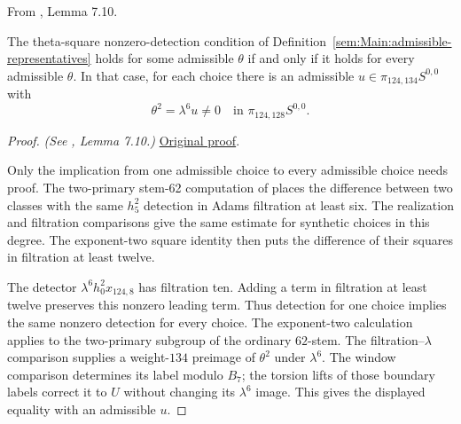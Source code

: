 \begin{lemma}
\label{paper:7.10}
From \cite{LWX126}, Lemma 7.10.\par

\label{lem:equistate4}
The theta-square nonzero-detection condition of
Definition~\ref{sem:Main:admissible-representatives} holds for some
admissible $\theta$ if and only if it holds for every admissible
$\theta$. In that case, for each choice there is an admissible
$u\in\pi_{124,134}S^{0,0}$ with
\[
 \theta^2=\lambda^6u\ne0\quad\text{in }\pi_{124,128}S^{0,0}.
\]



\end{lemma}
\begin{proof}
\textit{(See \cite{LWX126}, Lemma 7.10.)} \href{paper/main.tex.html#L2230}{Original proof}.

Only the implication from one admissible choice to every admissible choice needs proof. The two-primary stem-62 computation of \cite{IWX} places the difference between two classes with the same $h_5^2$ detection in Adams filtration at least six. The realization and filtration comparisons give the same estimate for synthetic choices in this degree. The exponent-two square identity then puts the difference of their squares in filtration at least twelve.

The detector $\lambda^6h_0^2x_{124,8}$ has filtration ten. Adding a term
in filtration at least twelve preserves this nonzero leading term.
Thus detection for one choice implies the same nonzero detection for
every choice. The exponent-two calculation applies to the two-primary
subgroup of the ordinary $62$-stem.
The filtration--$\lambda$ comparison supplies a weight-$134$ preimage
of $\theta^2$ under $\lambda^6$. The window comparison determines its
label modulo $B_7$; the torsion lifts of those boundary labels correct
it to $U$ without changing its $\lambda^6$ image. This gives the
displayed equality with an admissible $u$.
\end{proof}

